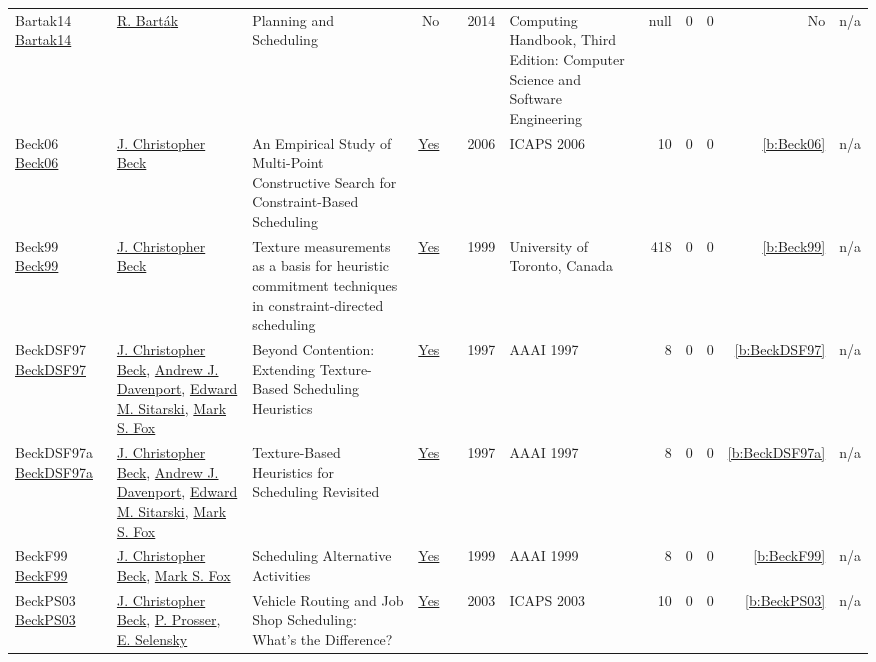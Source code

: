 {\begin{longtable}{>{\raggedright\arraybackslash}p{3cm}>{\raggedright\arraybackslash}p{6cm}>{\raggedright\arraybackslash}p{6.5cm}rrrp{2.5cm}rrrrr}
Bartak14 \href{}{Bartak14} & \hyperref[auth:a153]{R. Bart{\'{a}}k} & Planning and Scheduling & No & \cite{Bartak14} & 2014 & Computing Handbook, Third Edition: Computer Science and Software Engineering & null & 0 & 0 & No & n/a\\
Beck06 \href{http://www.aaai.org/Library/ICAPS/2006/icaps06-028.php}{Beck06} & \hyperref[auth:a89]{J. Christopher Beck} & An Empirical Study of Multi-Point Constructive Search for Constraint-Based Scheduling & \href{../works/Beck06.pdf}{Yes} & \cite{Beck06} & 2006 & ICAPS 2006 & 10 & 0 & 0 & \ref{b:Beck06} & n/a\\
Beck99 \href{https://librarysearch.library.utoronto.ca/permalink/01UTORONTO_INST/14bjeso/alma991106162342106196}{Beck99} & \hyperref[auth:a89]{J. Christopher Beck} & Texture measurements as a basis for heuristic commitment techniques in constraint-directed scheduling & \href{../works/Beck99.pdf}{Yes} & \cite{Beck99} & 1999 & University of Toronto, Canada & 418 & 0 & 0 & \ref{b:Beck99} & n/a\\
BeckDSF97 \href{http://www.aaai.org/Library/AAAI/1997/aaai97-037.php}{BeckDSF97} & \hyperref[auth:a89]{J. Christopher Beck}, \hyperref[auth:a250]{Andrew J. Davenport}, \hyperref[auth:a1311]{Edward M. Sitarski}, \hyperref[auth:a304]{Mark S. Fox} & Beyond Contention: Extending Texture-Based Scheduling Heuristics & \href{../works/BeckDSF97.pdf}{Yes} & \cite{BeckDSF97} & 1997 & AAAI 1997 & 8 & 0 & 0 & \ref{b:BeckDSF97} & n/a\\
BeckDSF97a \href{http://www.aaai.org/Library/AAAI/1997/aaai97-038.php}{BeckDSF97a} & \hyperref[auth:a89]{J. Christopher Beck}, \hyperref[auth:a250]{Andrew J. Davenport}, \hyperref[auth:a1311]{Edward M. Sitarski}, \hyperref[auth:a304]{Mark S. Fox} & Texture-Based Heuristics for Scheduling Revisited & \href{../works/BeckDSF97a.pdf}{Yes} & \cite{BeckDSF97a} & 1997 & AAAI 1997 & 8 & 0 & 0 & \ref{b:BeckDSF97a} & n/a\\
BeckF99 \href{http://www.aaai.org/Library/AAAI/1999/aaai99-097.php}{BeckF99} & \hyperref[auth:a89]{J. Christopher Beck}, \hyperref[auth:a304]{Mark S. Fox} & Scheduling Alternative Activities & \href{../works/BeckF99.pdf}{Yes} & \cite{BeckF99} & 1999 & AAAI 1999 & 8 & 0 & 0 & \ref{b:BeckF99} & n/a\\
BeckPS03 \href{http://www.aaai.org/Library/ICAPS/2003/icaps03-027.php}{BeckPS03} & \hyperref[auth:a89]{J. Christopher Beck}, \hyperref[auth:a833]{P. Prosser}, \hyperref[auth:a834]{E. Selensky} & Vehicle Routing and Job Shop Scheduling: What's the Difference? & \href{../works/BeckPS03.pdf}{Yes} & \cite{BeckPS03} & 2003 & ICAPS 2003 & 10 & 0 & 0 & \ref{b:BeckPS03} & n/a\\

\end{longtable}}

